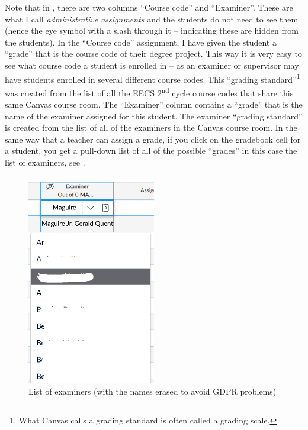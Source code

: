 Note that in , there are two columns “Course code” and “Examiner”. These are what I call \textit{administrative assignments} and the students do not need to see them (hence the eye symbol with a slash through it – indicating these are hidden from the students). In the “Course code” assignment, I have given the student a “grade” that is the course code of their degree project. This way it is very easy to see what course code a student is enrolled in – as an examiner or supervisor may have students enrolled in several different course codes. This “grading standard”\footnote{What Canvas calls a grading standard is often called a grading scale.} was created from the list of all the EECS 2\textsuperscript{nd} cycle course codes that share this same Canvas course room. The “Examiner” column contains a “grade” that is the name of the examiner assigned for this student. The examiner “grading standard” is created from the list of all of the examiners in the Canvas course room. In the same way that a teacher can assign a grade, if you click on the gradebook cell for a student, you get a pull-down list of all of the possible “grades” in this case the list of examiners, see .
\begin{figure}[!ht]
  \begin{center}
    \includegraphics[width=0.5\textwidth]{README_notes/README-examiner-figures/top-of-the-list-of-examiners-Screenshot_20220325_153634.png}
  \end{center}
  \caption[List of examiners]{List of examiners (with the names erased to avoid GDPR problems)}
  \label{fig:listOfExaminers}
\end{figure}

